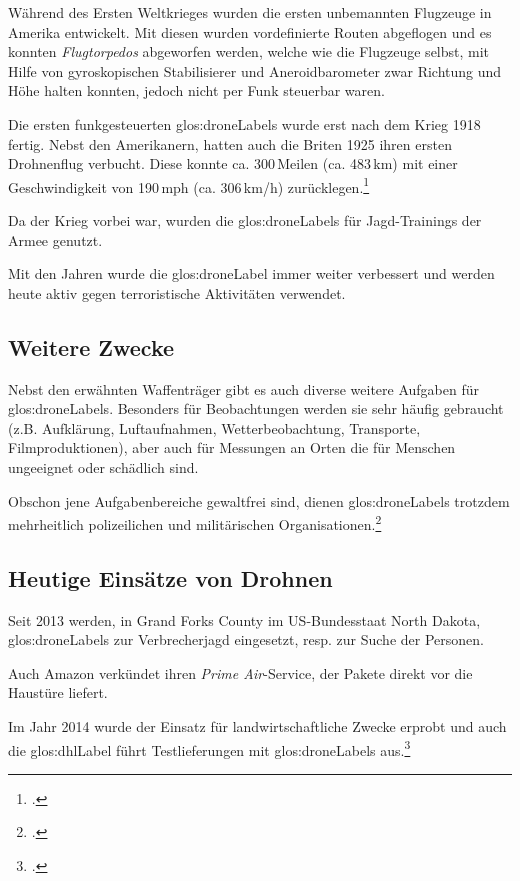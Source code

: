 Während des Ersten Weltkrieges wurden die ersten unbemannten Flugzeuge in Amerika entwickelt.
Mit diesen wurden vordefinierte Routen abgeflogen und es konnten \textit{Flugtorpedos} abgeworfen werden, welche wie die Flugzeuge selbst, mit Hilfe von gyroskopischen Stabilisierer und Aneroidbarometer zwar Richtung und Höhe halten konnten, jedoch nicht per Funk steuerbar waren.

Die ersten funkgesteuerten \glspl{glos:droneLabel} wurde erst nach dem Krieg 1918 fertig. Nebst den Amerikanern, hatten auch die Briten 1925 ihren ersten Drohnenflug verbucht. Diese konnte ca. 300\,Meilen (ca. 483\,km) mit einer Geschwindigkeit von 190\,mph (ca. 306\,km/h) zurücklegen.\footcite{Informatik_und_Gesellschaft_2015-03-21}

Da der Krieg vorbei war, wurden die \glspl{glos:droneLabel} für Jagd-Trainings der Armee genutzt.

Mit den Jahren wurde die \gls{glos:droneLabel} immer weiter verbessert und werden heute aktiv gegen terroristische Aktivitäten verwendet.

\subsection{Weitere Zwecke}
Nebst den erwähnten Waffenträger gibt es auch diverse weitere Aufgaben für \glspl{glos:droneLabel}.
Besonders für Beobachtungen werden sie sehr häufig gebraucht (z.B. Aufklärung, Luftaufnahmen, Wetterbeobachtung, Transporte, Filmproduktionen), aber auch für Messungen an Orten die für Menschen ungeeignet oder schädlich sind.

Obschon jene Aufgabenbereiche gewaltfrei sind, dienen \glspl{glos:droneLabel} trotzdem mehrheitlich polizeilichen und militärischen Organisationen.\footcite{Die_Geschichte_der_Drohnen_DiePresse.com_2015-03-21}

\subsection{Heutige Einsätze von Drohnen}
Seit 2013 werden, in Grand Forks County im US-Bundesstaat North Dakota, \glspl{glos:droneLabel} zur Verbrecherjagd eingesetzt, resp. zur Suche der Personen.

Auch Amazon verkündet ihren \textit{Prime Air}-Service, der Pakete direkt vor die Haustüre liefert.

Im Jahr 2014 wurde der Einsatz für landwirtschaftliche Zwecke erprobt und auch die \gls{glos:dhlLabel} führt Testlieferungen mit \glspl{glos:droneLabel} aus.\footcite{Kleine_Geschichte_der_Drohnen_-_Nachrichten_Print_-_WELT_KOMPAKT_-_Lifestyle_-_DIE_WELT_2015-03-21}



